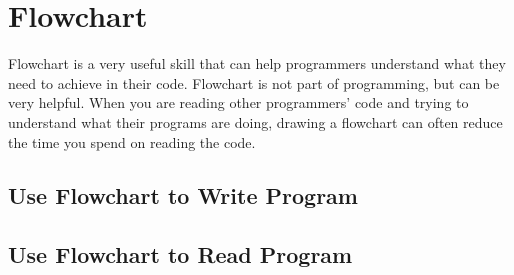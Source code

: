 \documentclass[../main.tex]{subfiles}
\begin{document}
    \section{Flowchart}
    Flowchart is a very useful skill that can help programmers understand what
    they need to achieve in their code. Flowchart is not part of programming, but
    can be very helpful. When you are reading other programmers' code and trying
    to understand what their programs are doing, drawing a flowchart can often
    reduce the time you spend on reading the code.

    \subsection{Use Flowchart to Write Program}
    \subsection{Use Flowchart to Read Program}
\end{document}
